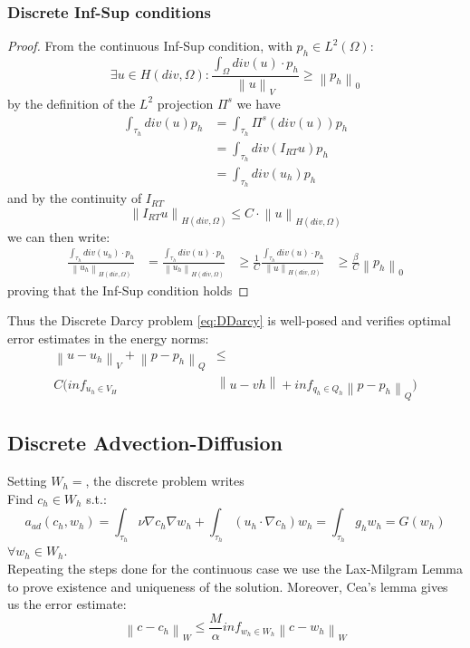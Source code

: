 \documentclass[conference]{IEEEtran}
\newcommand{\norm}[1]{\left\lVert#1\right\rVert}
\begin{document}
\subsubsection{Discrete Inf-Sup conditions}
\begin{proof}
From the continuous Inf-Sup condition, with $p_h \in L^2(\Omega)$:
\begin{equation*}
	\exists u \in H(div,\Omega) : \frac{ \int_{\Omega} div(u)\cdot p_h}{\norm{u}_V} \geq  \norm{p_h}_0
\end{equation*}
by the definition of the $L^2$ projection $\Pi^s$ we have
\begin{align*}
	\int_{\tau_h} div(u) p_h &= \int_{\tau_h}\Pi^s(div(u))p_h \\
	&=\int_{\tau_h} div(I_{RT} u) p_h \\
	&=\int_{\tau_h} div(u_h) p_h
\end{align*}
and by the continuity of $I_{RT}$
\begin{equation*}
	\norm{I_{RT}u}_{H(div,\Omega)} \leq C \cdot \norm{u}_{H(div,\Omega)}
\end{equation*}
we can then write:
\begin{align*}
	 \frac{ \int_{\tau_h} div(u_h)\cdot p_h}{\norm{u_h}_{H(div,\Omega)}}
	 &= \frac{ \int_{\tau_h} div(u)\cdot p_h}{\norm{u_h}_{H(div,\Omega)}}
	 & \geq \frac{1}{C} \frac{ \int_{\tau_h} div(u)\cdot p_h}{\norm{u}_{H(div,\Omega)}}
	 & \geq \frac{\beta}{C} \norm{p_h}_0
\end{align*}
proving that the Inf-Sup condition holds
\end{proof}

Thus the Discrete Darcy problem \ref{eq:DDarcy} is well-posed and verifies optimal error estimates in the energy norms:
\begin{align*}
	\norm{u-u_h}_V + \norm{p-p_h}_Q &\leq \\
	 C (inf_{u_h \in V_H}&\norm{u-vh} + inf_{q_h \in Q_h}\norm{p-p_h}_Q)
\end{align*}

\subsection{Discrete Advection-Diffusion}
Setting $W_h=$, the discrete problem writes\\
Find $c_h \in W_h$ s.t.:
\begin{equation}
	  a_{ad}(c_h,w_h) = \int_{\tau_h} \nu \nabla c_h \nabla w_h
      + \int_{\tau_h} (u_h \cdot \nabla c_h) w_h
      = \int_{\tau_h} g_h w_h = G(w_h)   	
\end{equation}
$\forall w_h \in W_h$.\\
Repeating the steps done for the continuous case we use the Lax-Milgram Lemma to prove existence and uniqueness of the solution. Moreover, Cea's lemma gives us the error estimate:\\
$$ \norm{c-c_h}_W \leq \frac{M}{\alpha} inf_{w_h \in W_h} \norm{c-w_h}_W $$
\end{document}
